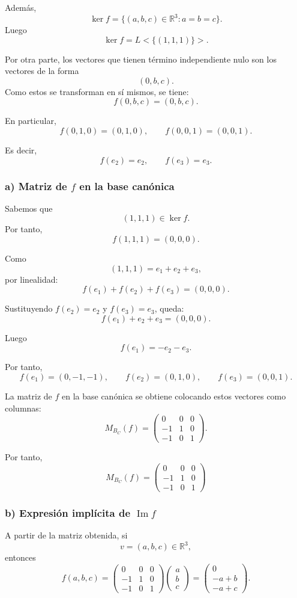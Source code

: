 \documentclass[12pt]{article}
\begin{document}
Además,
\[
\ker f=\{(a,b,c)\in\mathbb{R}^3:a=b=c\}.
\]
Luego
\[
\ker f=L<\{(1,1,1)\}>.
\]

Por otra parte, los vectores que tienen término independiente nulo son los vectores de la forma
\[
(0,b,c).
\]
Como estos se transforman en sí mismos, se tiene:
\[
f(0,b,c)=(0,b,c).
\]

En particular,
\[
f(0,1,0)=(0,1,0),
\qquad
f(0,0,1)=(0,0,1).
\]

Es decir,
\[
f(e_2)=e_2,
\qquad
f(e_3)=e_3.
\]

\subsubsection*{a) Matriz de \(f\) en la base canónica}

Sabemos que
\[
(1,1,1)\in \ker f.
\]
Por tanto,
\[
f(1,1,1)=(0,0,0).
\]

Como
\[
(1,1,1)=e_1+e_2+e_3,
\]
por linealidad:
\[
f(e_1)+f(e_2)+f(e_3)=(0,0,0).
\]

Sustituyendo \(f(e_2)=e_2\) y \(f(e_3)=e_3\), queda:
\[
f(e_1)+e_2+e_3=(0,0,0).
\]

Luego
\[
f(e_1)=-e_2-e_3.
\]

Por tanto,
\[
f(e_1)=(0,-1,-1),
\qquad
f(e_2)=(0,1,0),
\qquad
f(e_3)=(0,0,1).
\]

La matriz de \(f\) en la base canónica se obtiene colocando estos vectores como columnas:
\[
M_{B_C}(f)=
\begin{pmatrix}
0&0&0\\
-1&1&0\\
-1&0&1
\end{pmatrix}.
\]

Por tanto,
\[
\boxed{
M_{B_C}(f)=
\begin{pmatrix}
0&0&0\\
-1&1&0\\
-1&0&1
\end{pmatrix}
}
\]

\subsubsection*{b) Expresión implícita de \(\operatorname{Im} f\)}

A partir de la matriz obtenida, si
\[
v=(a,b,c)\in\mathbb{R}^3,
\]
entonces
\[
f(a,b,c)=
\begin{pmatrix}
0&0&0\\
-1&1&0\\
-1&0&1
\end{pmatrix}
\begin{pmatrix}
a\\
b\\
c
\end{pmatrix}
=
\begin{pmatrix}
0\\
-a+b\\
-a+c
\end{pmatrix}.
\]
\end{document}
